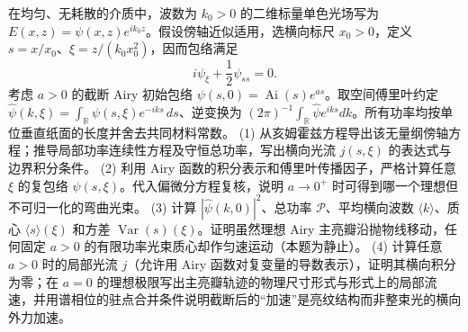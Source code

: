 在均匀、无耗散的介质中，波数为 \(k_0>0\) 的二维标量单色光场写为 \(E(x,z)=\psi(x,z)e^{ik_0z}\)。假设傍轴近似适用，选横向标尺 \(x_0>0\)，定义 \(s=x/x_0\)、\(\xi=z/(k_0x_0^2)\)，因而包络满足
\[
i\psi_\xi+\frac12\psi_{ss}=0.
\]
考虑 \(a>0\) 的截断 Airy 初始包络 \(\psi(s,0)=\operatorname{Ai}(s)e^{as}\)。取空间傅里叶约定 \(\widehat\psi(k,\xi)=\int_{\mathbb R}\psi(s,\xi)e^{-iks}\,ds\)、逆变换为 \((2\pi)^{-1}\int_{\mathbb R}\widehat\psi e^{iks}dk\)。所有功率均按单位垂直纸面的长度并舍去共同材料常数。
(1) 从亥姆霍兹方程导出该无量纲傍轴方程；推导局部功率连续性方程及守恒总功率，写出横向光流 \(j(s,\xi)\) 的表达式与边界积分条件。
(2) 利用 Airy 函数的积分表示和傅里叶传播因子，严格计算任意 \(\xi\) 的复包络 \(\psi(s,\xi)\)。代入偏微分方程复核，说明 \(a\to0^+\) 时可得到哪一个理想但不可归一化的弯曲光束。
(3) 计算 \(|\widehat\psi(k,0)|^2\)、总功率 \(\mathcal P\)、平均横向波数 \(\langle k\rangle\)、质心 \(\langle s\rangle(\xi)\) 和方差 \(\operatorname{Var}(s)(\xi)\)。证明虽然理想 Airy 主亮瓣沿抛物线移动，任何固定 \(a>0\) 的有限功率光束质心却作匀速运动（本题为静止）。
(4) 计算任意 \(a>0\) 时的局部光流 \(j\)（允许用 Airy 函数对复变量的导数表示），证明其横向积分为零；在 \(a=0\) 的理想极限写出主亮瓣轨迹的物理尺寸形式与形式上的局部流速，并用谱相位的驻点合并条件说明截断后的“加速”是亮纹结构而非整束光的横向外力加速。